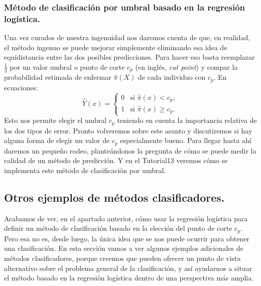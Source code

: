 \subsubsection*{Método de clasificación por umbral basado en la regresión logística.}
\label{cap13:subsubsec:MetodoClasificacionUmbral}

Una vez curados de nuestra ingenuidad nos daremos cuenta de que, en realidad, el método ingenuo se puede mejorar simplemente eliminando esa idea de equidistancia entre las dos posibles predicciones. Para hacer eso basta reemplazar $\frac{1}{2}$ por un {\sf valor  umbral} o {\sf punto de corte} $c_p$ (en inglés, {\em cut point}) y compar la probabilidad estimada de enfermar $\hat{\pi}(X)$ de cada individuo  con $c_p$. En ecuaciones:
\begin{equation}
\label{cap13:ecu:clasificadorLogisticoUmbral}
\hat Y(x) =
\begin{cases}
	0 &\mbox{si } \hat{\pi}(x) < c_p,\\[3mm]
	1 &\mbox{si } \hat{\pi}(x) \geq c_p.
\end{cases}	
\end{equation}
Esto nos permite  elegir el umbral $c_p$ teniendo en cuenta la importancia relativa de los dos tipos de error. Pronto volveremos sobre este asunto y discutiremos si hay alguna forma de elegir un valor  de $c_p$ especialmente bueno. Para llegar hasta ahí daremos un pequeño rodeo, planteándonos la pregunta de cómo se puede medir la calidad de un método de predicción. Y en el Tutorial13 veremos cómo se implementa este método de clasificación por umbral.

\subsection{Otros ejemplos de métodos clasificadores.}
\label{cap13:subsec:OtrosEjemplosMetodosClasificadores}


Acabamos de ver, en el apartado anterior, cómo usar la regresión logística para definir un método de clasificación basado en la elección del punto de corte $c_p$. Pero esa no es, desde luego, la única idea que se nos puede ocurrir para obtener una clasificación. En esta sección vamos a ver algunos ejemplos adicionales de métodos clasificadores, porque creemos que pueden ofrecer un punto de vista alternativo sobre el problema general de la clasificación, y así  ayudarnos a situar el método basado en la regresión logística dentro de una perspectiva más amplia.

